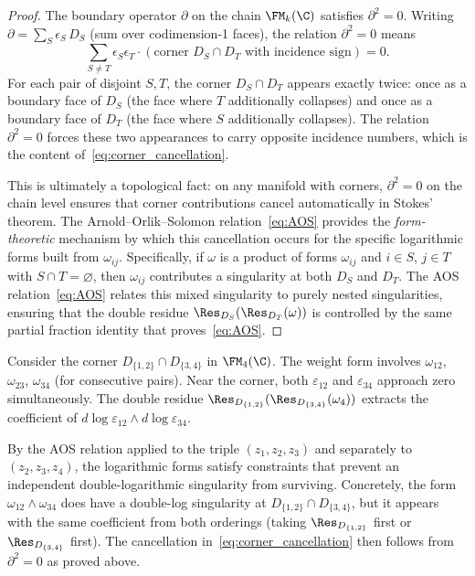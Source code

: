 \begin{proof}
The boundary operator $\partial$ on the chain $\FM_k(\C)$ satisfies $\partial^2 = 0$. Writing $\partial = \sum_S \epsilon_S\, D_S$ (sum over codimension-1 faces), the relation $\partial^2 = 0$ means
\[
\sum_{S \neq T} \epsilon_S \epsilon_T \cdot (\text{corner } D_S \cap D_T \text{ with incidence sign}) = 0.
\]
For each pair of disjoint $S, T$, the corner $D_S \cap D_T$ appears exactly twice: once as a boundary face of $D_S$ (the face where $T$ additionally collapses) and once as a boundary face of $D_T$ (the face where $S$ additionally collapses). The relation $\partial^2 = 0$ forces these two appearances to carry opposite incidence numbers, which is the content of~\eqref{eq:corner_cancellation}.

This is ultimately a topological fact: on any manifold with corners, $\partial^2 = 0$ on the chain level ensures that corner contributions cancel automatically in Stokes' theorem. The Arnold--Orlik--Solomon relation~\eqref{eq:AOS} provides the \emph{form-theoretic} mechanism by which this cancellation occurs for the specific logarithmic forms built from $\omega_{ij}$. Specifically, if $\omega$ is a product of forms $\omega_{ij}$ and $i \in S$, $j \in T$ with $S \cap T = \varnothing$, then $\omega_{ij}$ contributes a singularity at both $D_S$ and $D_T$. The AOS relation~\eqref{eq:AOS} relates this mixed singularity to purely nested singularities, ensuring that the double residue $\Res_{D_S}(\Res_{D_T}(\omega))$ is controlled by the same partial fraction identity that proves~\eqref{eq:AOS}.
\end{proof}

\begin{example}[Arnold cancellation for $k=4$, $S=\{1,2\}$, $T=\{3,4\}$]
\label{ex:arnold_k4}
Consider the corner $D_{\{1,2\}} \cap D_{\{3,4\}}$ in $\FM_4(\C)$. The weight form involves $\omega_{12}$, $\omega_{23}$, $\omega_{34}$ (for consecutive pairs). Near the corner, both $\varepsilon_{12}$ and $\varepsilon_{34}$ approach zero simultaneously. The double residue $\Res_{D_{\{1,2\}}}(\Res_{D_{\{3,4\}}}(\omega_4))$ extracts the coefficient of $d\log\varepsilon_{12} \wedge d\log\varepsilon_{34}$.

By the AOS relation applied to the triple $(z_1, z_2, z_3)$ and separately to $(z_2, z_3, z_4)$, the logarithmic forms satisfy constraints that prevent an independent double-logarithmic singularity from surviving. Concretely, the form $\omega_{12} \wedge \omega_{34}$ does have a double-log singularity at $D_{\{1,2\}} \cap D_{\{3,4\}}$, but it appears with the same coefficient from both orderings (taking $\Res_{D_{\{1,2\}}}$ first or $\Res_{D_{\{3,4\}}}$ first). The cancellation in~\eqref{eq:corner_cancellation} then follows from $\partial^2 = 0$ as proved above.
\end{example}


